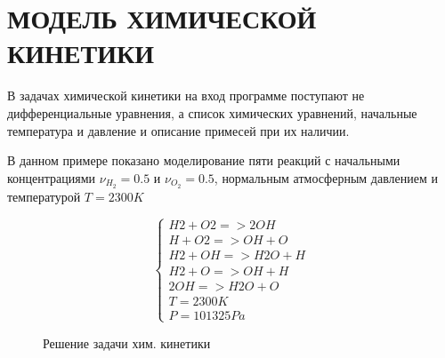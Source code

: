 \section{МОДЕЛЬ ХИМИЧЕСКОЙ КИНЕТИКИ}

В задачах химической кинетики на вход программе поступают не дифференциальные уравнения, а список химических уравнений, начальные
температура и давление и описание примесей при их наличии.

В данном примере показано моделирование пяти реакций с начальными концентрациями $\nu_{H_2} = 0.5$ и $\nu_{O_2} = 0.5$, нормальным
атмосферным давлением и температурой $T = 2300K$

%         

$$
\begin{cases}
    H2 + O2 => 2OH\\
    H + O2 => OH + O\\
    H2 + OH => H2O + H\\
    H2 + O => OH + H\\
    2OH => H2O + O\\
    T = 2300K\\
    P = 101325Pa
\end{cases}
$$

\begin{figure}
    
    \caption{Решение задачи хим. кинетики}
    \label{fig:chem1}
\end{figure}

